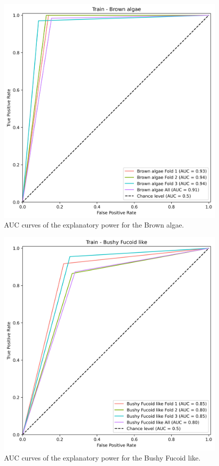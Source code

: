 \begin{figure}
\hypertarget{fig:chap3figS9}{%
\centering
\includegraphics{03-Chapitre3/figures/supplementary/03-receiver_operator_curve_train_rf_Brown algae.png}
\caption{AUC curves of the explanatory power for the Brown
algae.}\label{fig:chap3figS9}
}
\end{figure}

\begin{figure}
\hypertarget{fig:chap3figS10}{%
\centering
\includegraphics{03-Chapitre3/figures/supplementary/03-receiver_operator_curve_train_rf_Bushy Fucoid like.png}
\caption{AUC curves of the explanatory power for the Bushy Fucoid
like.}\label{fig:chap3figS10}
}
\end{figure}

